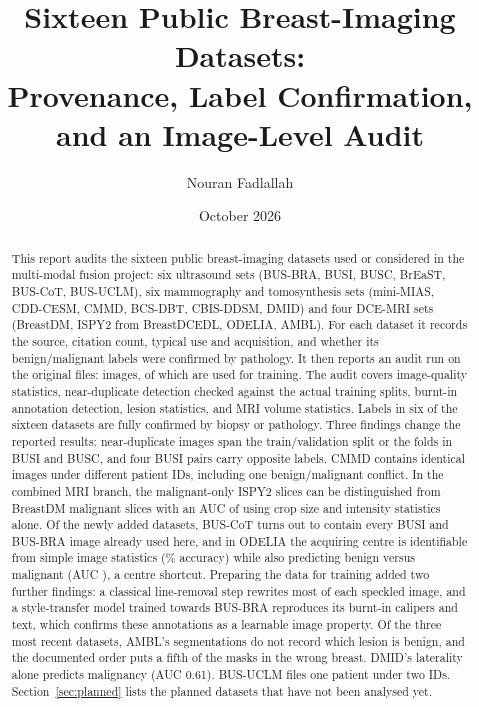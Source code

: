 \documentclass[11pt]{article}
\title{Sixteen Public Breast-Imaging Datasets:\\Provenance, Label Confirmation, and an Image-Level Audit}
\author{Nouran Fadlallah}
\date{October 2026}
\begin{document}
\maketitle

\begin{abstract}
This report audits the sixteen public breast-imaging datasets used or
considered in the multi-modal fusion project: six ultrasound sets (BUS-BRA,
BUSI, BUSC, BrEaST, BUS-CoT, BUS-UCLM), six mammography and tomosynthesis sets
(mini-MIAS, CDD-CESM, CMMD, BCS-DBT, CBIS-DDSM, DMID) and four DCE-MRI sets
(BreastDM, ISPY2 from BreastDCEDL, ODELIA, AMBL). For each dataset it records the source,
citation count, typical use and acquisition, and whether its benign/malignant
labels were confirmed by pathology. It then reports an audit run on the
original files: \totalImages{} images, of which \totalUsed{} are used for
training. The audit covers image-quality statistics, near-duplicate
detection checked against the actual training splits, burnt-in annotation
detection, lesion statistics, and MRI volume statistics. Labels in six of the
sixteen datasets are fully confirmed by biopsy or pathology. Three findings
change the reported results: near-duplicate images span the train/validation
split or the folds in BUSI and BUSC, and four BUSI pairs carry opposite labels.
CMMD contains identical images under different patient IDs, including one
benign/malignant conflict. In the combined MRI branch, the malignant-only ISPY2
slices can be distinguished from BreastDM malignant slices with an AUC of
\probeAll{} using crop size and intensity statistics alone. Of the newly added
datasets, BUS-CoT turns out to contain every BUSI and BUS-BRA image already
used here, and in ODELIA the acquiring centre is identifiable from simple image
statistics (\odeliaCentreAcc\% accuracy) while also predicting benign versus
malignant (AUC \odeliaCentreOnlyAUC), a centre shortcut. Preparing the data
for training added two further findings: a classical line-removal step
rewrites most of each speckled image, and a style-transfer model trained
towards BUS-BRA reproduces its burnt-in calipers and text, which confirms
these annotations as a learnable image property. Of the three most recent
datasets, AMBL's segmentations do not record which lesion is benign, and
the documented order puts a fifth of the masks in the wrong breast. DMID's
laterality alone predicts malignancy (AUC 0.61). BUS-UCLM files one patient
under two IDs. Section~\ref{sec:planned} lists the planned datasets that have
not been analysed yet.
\end{abstract}
\end{document}
